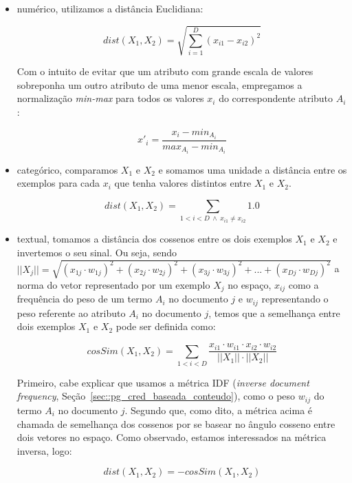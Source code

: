 \begin{itemize}

\item numérico, utilizamos a distância Euclidiana:

\begin{equation}\label{eqn::distancia_euclidiana}
    dist(X_1, X_2) =  \sqrt{\sum_{i=1}^D (x_{i1}-x_{i2})^2}
\end{equation}

    Com o intuito de evitar que um atributo com grande escala de valores sobreponha um outro atributo de uma menor escala, empregamos a normalização \textit{min-max} para todos os valores $x_i$ do correspondente atributo $A_i$: 

\begin{equation}\label{eqn::distancia_euclidiana}
    x'_{i} =  \frac{x_{i} - min_{A_i}}{ max_{A_i} - min_{A_i} }
\end{equation}

\item categórico, comparamos $X_1$ e $X_2$ e somamos uma unidade a distância entre os exemplos para cada $x_i$ que tenha valores distintos entre $X_1$ e $X_2$.

\begin{equation}\label{eqn::distancia_cat}
   dist(X_1, X_2) = \sum_{1 < i < D \ \wedge \ x_{i1} \neq x_{i2}} 1.0
\end{equation}

\item textual, tomamos a distância dos cossenos entre os dois exemplos $X_1$ e $X_2$ e invertemos o seu sinal. Ou seja, sendo $||X_j|| = \sqrt{ (x_{1j} \cdot w_{1j})^2 + (x_{2j} \cdot w_{2j})^2 + (x_{3j} \cdot w_{3j})^2 + ... + (x_{Dj} \cdot w_{Dj})^2}$ a norma do vetor representado por um exemplo $X_j$ no espaço, $x_{ij}$ como a frequência do peso de um termo $A_i$ no documento $j$ e $w_{ij}$ representando o peso referente ao atributo $A_i$ no documento $j$, temos que a semelhança entre dois exemplos $X_1$ e $X_2$ pode ser definida como:

\begin{equation}\label{eqn::distancia_texto}
    cosSim(X_1, X_2) = \sum\limits_{1 < i < D} \frac{ x_{i1} \cdot w_{i1} \cdot x_{i2} \cdot w_{i2} }{ ||X_1|| \cdot ||X_2|| }
\end{equation}

Primeiro, cabe explicar que usamos a métrica \textsc{IDF} (\textit{inverse document frequency}, Seção~\ref{sec::pg_cred_baseada_conteudo}), como o peso $w_{ij}$ do termo $A_i$ no documento $j$. Segundo que, como dito, a métrica acima é chamada de semelhança dos cossenos por se basear no ângulo cosseno entre dois vetores no espaço. Como observado, estamos interessados na métrica inversa, logo:
 
 \begin{equation}\label{eqn::distancia_texto}
    dist(X_1, X_2) = - cosSim(X_1, X_2)
\end{equation}


\end{itemize}

